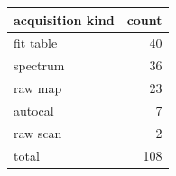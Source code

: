 \begin{tabular}{lr}
\toprule
acquisition kind & count \\
\midrule
fit table & 40 \\
spectrum & 36 \\
raw map & 23 \\
autocal & 7 \\
raw scan & 2 \\
\midrule
total & 108 \\
\bottomrule
\end{tabular}
